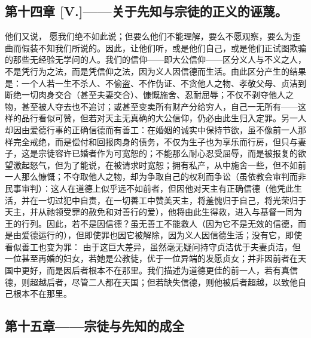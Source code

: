 \subsection{第十四章 [V.]——关于先知与宗徒的正义的诬蔑。}

他们又说， 愿我们绝不如此说；但要么他们不能理解，要么不愿观察，要么为歪曲而假装不知我们所说的。因此，让他们听，或是他们自己，或是他们正试图欺骗的那些无经验无学问的人。我们的信仰——即大公信仰——区分义人与不义之人，不是凭行为之法，而是凭信仰之法，因为义人因信德而生活。由此区分产生的结果是：一个人若一生不杀人、不偷盗、不作伪证、不贪他人之物、孝敬父母、贞洁到断绝一切肉身交合（甚至夫妻交合）、慷慨施舍、忍耐屈辱；不仅不剥夺他人之物，甚至被人夺去也不追讨；或甚至变卖所有财产分给穷人，自己一无所有——这样的品行看似可赞，但若对天主无真确的大公信仰，仍必由此生归入定罪。另一人却因由爱德行事的正确信德而有善工：在婚姻的诚实中保持节欲，虽不像前一人那样完全戒绝，而是偿付和回报肉身的债务，不仅为生子也为享乐而行房，但只与妻子，这是宗徒容许已婚者作为可宽恕的；不能那么耐心忍受屈辱，而是被报复的欲望激起怒气，但为了能说，在被请求时宽恕；拥有私产，从中施舍一些，但不如前一人那么慷慨；不夺取他人之物，却为争取自己的权利而争讼（虽依教会审判而非民事审判）：这人在道德上似乎远不如前者，但因他对天主有正确信德（他凭此生活，并在一切过犯中自责，在一切善工中赞美天主，将羞愧归于自己，将光荣归于天主，并从祂领受罪的赦免和对善行的爱），他将由此生得救，进入与基督一同为王的行列。因此，若不是因信德？虽无善工不能救人（因为它不是无效的信德，而是由爱德运行的），但即使罪也因它被解除，因为义人因信德生活；没有它，即使看似善工也变为罪：  由于这巨大差异，虽然毫无疑问持守贞洁优于夫妻贞洁，但一位甚至再婚的妇女，若她是公教徒，优于一位异端的发愿贞女；并非因前者在天国中更好，而是因后者根本不在那里。我们描述为道德更佳的前一人，若有真信德，则超越后者，尽管二人都在天国；但若缺失信德，则他被后者超越，以致他自己根本不在那里。\par


\subsection{第十五章——宗徒与先知的成全}


